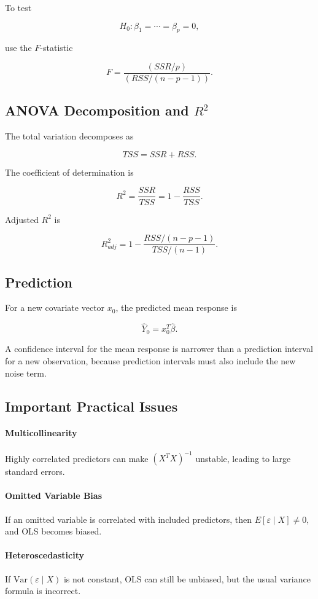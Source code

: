 \documentclass[a4paper,10pt]{article}
\begin{document}
To test

\[
H_0:\beta_1=\cdots=\beta_p=0,
\]

use the $F$-statistic

\[
F=\frac{(SSR/p)}{(RSS/(n-p-1))}.
\]

\subsection{ANOVA Decomposition and $R^2$}

The total variation decomposes as

\[
TSS = SSR + RSS.
\]

The coefficient of determination is

\[
R^2 = \frac{SSR}{TSS} = 1-\frac{RSS}{TSS}.
\]

Adjusted $R^2$ is

\[
R^2_{adj}
=
1-\frac{RSS/(n-p-1)}{TSS/(n-1)}.
\]

\subsection{Prediction}

For a new covariate vector $x_0$, the predicted mean response is

\[
\hat Y_0 = x_0^T\hat\beta.
\]

A confidence interval for the mean response is narrower than a prediction interval for a new observation, because prediction intervals must also include the new noise term.

\subsection{Important Practical Issues}

\paragraph{Multicollinearity}
Highly correlated predictors can make $(X^TX)^{-1}$ unstable, leading to large standard errors.

\paragraph{Omitted Variable Bias}
If an omitted variable is correlated with included predictors, then $E[\varepsilon\mid X]\neq 0$, and OLS becomes biased.

\paragraph{Heteroscedasticity}
If $\mathrm{Var}(\varepsilon\mid X)$ is not constant, OLS can still be unbiased, but the usual variance formula is incorrect.
\end{document}
